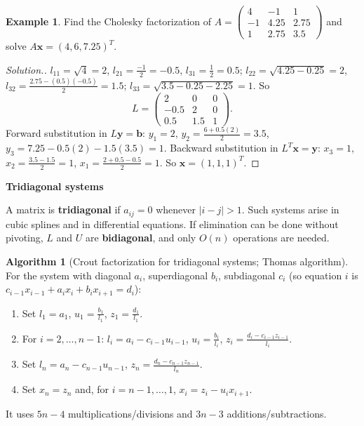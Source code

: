 \documentclass[11pt,a4paper]{article}
\numberwithin{equation}{section}
\theoremstyle{definition}
\newtheorem{exa}[thm]{Example}
\newtheorem{alg}[thm]{Algorithm}
\newenvironment{solution}
  {\renewcommand{\qedsymbol}{}\begin{proof}[\textit{Solution}.]}
  {\end{proof}}
\newcommand{\subhead}[1]{%
  \par\medskip\noindent\textbf{#1}\par\nobreak\smallskip}
\begin{document}
\begin{exa}
\label{exa:cholesky}
Find the Cholesky factorization of $A = \begin{pmatrix}4&-1&1\\-1&4.25&2.75\\1&2.75&3.5\end{pmatrix}$ and solve $A\mathbf x = (4,6,7.25)^T$.
\end{exa}

\begin{solution}
$l_{11} = \sqrt4 = 2$, $l_{21} = \frac{-1}{2} = -0.5$, $l_{31} = \frac12 = 0.5$;
$l_{22} = \sqrt{4.25-0.25} = 2$, $l_{32} = \frac{2.75-(0.5)(-0.5)}{2} = 1.5$; $l_{33} = \sqrt{3.5-0.25-2.25} = 1$. So
$$L = \begin{pmatrix}2&0&0\\-0.5&2&0\\0.5&1.5&1\end{pmatrix}.$$
Forward substitution in $L\mathbf y = \mathbf b$: $y_1 = 2$, $y_2 = \frac{6+0.5(2)}{2} = 3.5$, $y_3 = 7.25-0.5(2)-1.5(3.5) = 1$. Backward
substitution in $L^T\mathbf x = \mathbf y$: $x_3 = 1$, $x_2 = \frac{3.5-1.5}{2} = 1$, $x_1 = \frac{2+0.5-0.5}{2} = 1$. So $\mathbf x = (1,1,1)^T$.
\end{solution}

\subhead{Tridiagonal systems}
A matrix is \textbf{tridiagonal} if $a_{ij} = 0$ whenever $|i-j|>1$. Such systems arise in cubic splines and in differential equations. If
elimination can be done without pivoting, $L$ and $U$ are \textbf{bidiagonal}, and only $O(n)$ operations are needed.

\begin{alg}[Crout factorization for tridiagonal systems; Thomas algorithm]
\label{alg:thomas}
For the system with diagonal $a_i$, superdiagonal $b_i$, subdiagonal $c_i$ (so equation $i$ is $c_{i-1}x_{i-1}+a_ix_i+b_ix_{i+1} = d_i$):
\begin{enumerate}[label=Step \arabic*:,leftmargin=*]
\item Set $l_1 = a_1$, $u_1 = \frac{b_1}{l_1}$, $z_1 = \frac{d_1}{l_1}$.
\item For $i = 2,\dots,n-1$: $l_i = a_i-c_{i-1}u_{i-1}$, $u_i = \frac{b_i}{l_i}$, $z_i = \frac{d_i-c_{i-1}z_{i-1}}{l_i}$.
\item Set $l_n = a_n-c_{n-1}u_{n-1}$, $z_n = \frac{d_n-c_{n-1}z_{n-1}}{l_n}$.
\item Set $x_n = z_n$ and, for $i = n-1,\dots,1$, $x_i = z_i-u_ix_{i+1}$.
\end{enumerate}
It uses $5n-4$ multiplications/divisions and $3n-3$ additions/subtractions.
\end{alg}
\end{document}
